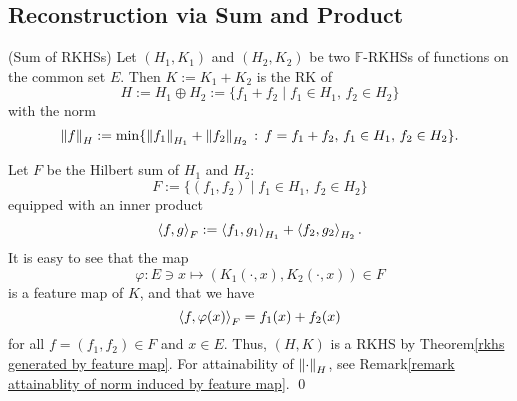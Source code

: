 \documentclass[a4paper,12pt]{article}
\begin{document}
\subsection{Reconstruction via Sum and Product}

\begin{thm} (Sum of RKHSs)
	Let \( (H_1,K_1) \) and \( (H_2,K_2) \) be two \( \mathbb{F} \)-RKHSs of functions on the common set \( E \).
	Then \( K:= K_1 + K_2 \) is the RK of
	\begin{equation*}
		H:= H_1 \oplus H_2:= \{f_1 + f_2 \mid f_1 \in H_1, \, f_2 \in H_2\}
	\end{equation*}
	with the norm
	\begin{equation*}
		\left\| f \right\|_H := \min \{\left\| f_1 \right\|_{H_1}+\left\| f_2 \right\|_{H_2} \,:\, f = f_1 + f_2,\,f_1 \in H_1,\,f_2 \in H_2\}.
	\end{equation*}
\end{thm}
\begin{prf}
	Let \( F \) be the Hilbert sum of \( H_1 \) and \( H_2 \):
	\begin{equation*}
		F := \{(f_1, f_2)\mid f_1 \in H_1,\, f_2 \in H_2\}
	\end{equation*}
	equipped with an inner product
	\begin{equation*}
		\left<f, g \right>_F := \left<f_1, g_1 \right>_{H_1} + \left<f_2, g_2 \right>_{H_2}.
	\end{equation*}
	It is easy to see that the map
	\begin{equation*}
		\varphi : E \ni x \mapsto \left( K_1(\cdot ,x), K_2(\cdot ,x) \right) \in F
	\end{equation*}
	is a feature map of \( K \), and that we have
	\begin{equation*}
		\left<f, \varphi(x) \right>_F = f_1(x)+f_2(x)
	\end{equation*}
	for all \( f = (f_1,f_2) \in F \) and \( x \in E \).
	Thus, \( (H,K) \) is a RKHS by Theorem\ref{rkhs generated by feature map}. For attainability of \( \left\| \cdot \right\|_H \), see Remark\ref{remark attainablity of norm induced by feature map}.
	\qed\end{prf}
\end{document}
